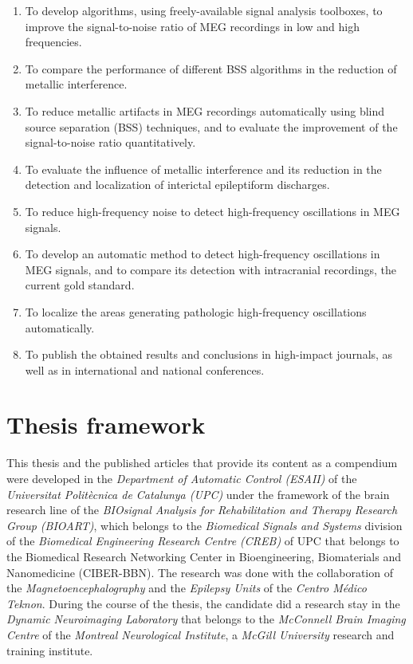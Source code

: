 \begin{enumerate}[I]

\item To develop algorithms, using freely-available signal analysis toolboxes, to improve the signal-to-noise ratio of MEG recordings in low and high frequencies. 
\item To compare the performance of different BSS algorithms in the reduction of metallic interference. 
\item To reduce metallic artifacts in MEG recordings automatically using blind source separation (BSS) techniques, and to evaluate the improvement of the signal-to-noise ratio quantitatively.
\item To evaluate the influence of metallic interference and its reduction in the detection and localization of interictal epileptiform discharges.
\item To reduce high-frequency noise to detect high-frequency oscillations in MEG signals.
\item To develop an automatic method to detect high-frequency oscillations in MEG signals, and to compare its detection with intracranial recordings, the current gold standard.
\item To localize the areas generating pathologic high-frequency oscillations automatically.
\item To publish the obtained results and conclusions in high-impact journals, as well as in international and national conferences.

\end{enumerate}

     \section{Thesis framework}
     
This thesis and the published articles that provide its content as a compendium were developed in the \emph{Department of Automatic Control (ESAII)} of the \emph{Universitat Polit\`{e}cnica de Catalunya (UPC)} under the framework of the brain research line of the \emph{BIOsignal Analysis for Rehabilitation and Therapy Research Group (BIOART)}, which belongs to the \emph{Biomedical Signals and Systems} division of the \emph{Biomedical Engineering Research Centre (CREB)} of UPC that belongs to the Biomedical Research Networking Center in Bioengineering, Biomaterials and Nanomedicine (CIBER-BBN). The research was done with the collaboration of the \textit{Magnetoencephalography} and the \textit{Epilepsy Units} of the \emph{Centro Médico Teknon}. During the course of the thesis, the candidate did a research stay in the \emph{Dynamic Neuroimaging Laboratory} that belongs to the \emph{McConnell Brain Imaging Centre} of the \emph{Montreal Neurological Institute}, a \emph{McGill University} research and training institute. 	

